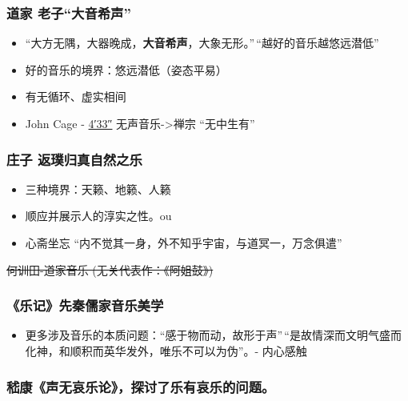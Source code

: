 \documentclass[
]{article}
\providecommand{\tightlist}{%
  \setlength{\itemsep}{0pt}\setlength{\parskip}{0pt}}
\begin{document}
\subsubsection{道家
老子``大音希声''}\label{ux9053ux5bb6-ux8001ux5b50ux5927ux97f3ux5e0cux58f0}

\begin{itemize}
\tightlist
\item
  ``大方无隅，大器晚成，\textbf{大音希声}，大象无形。''\,``越好的音乐越悠远潜低''
\item
  好的音乐的境界：悠远潜低（姿态平易）
\item
  有无循环、虚实相间
\item
  John Cage -
  \href{https://www.artnews.com/art-news/news/john-cage-4-33-explained-1234704644/}{4′33″}
  无声音乐-\textgreater 禅宗 ``无中生有''
\end{itemize}

\subsubsection{庄子
返璞归真自然之乐}\label{ux5e84ux5b50-ux8fd4ux749eux5f52ux771fux81eaux7136ux4e4bux4e50}

\begin{itemize}
\tightlist
\item
  三种境界：天籁、地籁、人籁
\item
  顺应并展示人的淳实之性。ou
\item
  心斋坐忘 ``内不觉其一身，外不知乎宇宙，与道冥一，万念俱遣''
\end{itemize}

\sout{何训田-道家音乐 (无关代表作：《阿姐鼓》) }

\subsubsection{《乐记》先秦儒家音乐美学}\label{ux4e50ux8bb0ux5148ux79e6ux5112ux5bb6ux97f3ux4e50ux7f8eux5b66}

\begin{itemize}
\tightlist
\item
  更多涉及音乐的本质问题：``感于物而动，故形于声''\,``是故情深而文明气盛而化神，和顺积而英华发外，唯乐不可以为伪''。-
  内心感触
\end{itemize}

\subsubsection{嵇康《声无哀乐论》，探讨了乐有哀乐的问题。}\label{ux5d47ux5eb7ux58f0ux65e0ux54c0ux4e50ux8bbaux63a2ux8ba8ux4e86ux4e50ux6709ux54c0ux4e50ux7684ux95eeux9898}
\end{document}
